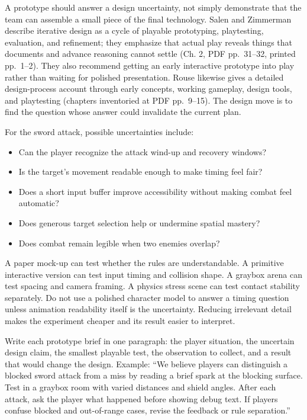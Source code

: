 A prototype should answer a design uncertainty, not simply demonstrate that the team can assemble a small piece of the final technology. Salen and Zimmerman describe iterative design as a cycle of playable prototyping, playtesting, evaluation, and refinement; they emphasize that actual play reveals things that documents and advance reasoning cannot settle (Ch. 2, PDF pp.~31--32, printed pp.~1--2). They also recommend getting an early interactive prototype into play rather than waiting for polished presentation. Rouse likewise gives a detailed design-process account through early concepts, working gameplay, design tools, and playtesting (chapters inventoried at PDF pp.~9--15). The design move is to find the question whose answer could invalidate the current plan.

For the sword attack, possible uncertainties include:

\begin{itemize}
\tightlist
\item
  Can the player recognize the attack wind-up and recovery windows?
\item
  Is the target's movement readable enough to make timing feel fair?
\item
  Does a short input buffer improve accessibility without making combat feel automatic?
\item
  Does generous target selection help or undermine spatial mastery?
\item
  Does combat remain legible when two enemies overlap?
\end{itemize}

A paper mock-up can test whether the rules are understandable. A primitive interactive version can test input timing and collision shape. A graybox arena can test spacing and camera framing. A physics stress scene can test contact stability separately. Do not use a polished character model to answer a timing question unless animation readability itself is the uncertainty. Reducing irrelevant detail makes the experiment cheaper and its result easier to interpret.

Write each prototype brief in one paragraph: the player situation, the uncertain design claim, the smallest playable test, the observation to collect, and a result that would change the design. Example: ``We believe players can distinguish a blocked sword attack from a miss by reading a brief spark at the blocking surface. Test in a graybox room with varied distances and shield angles. After each attack, ask the player what happened before showing debug text. If players confuse blocked and out-of-range cases, revise the feedback or rule separation.''


